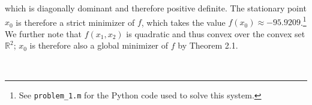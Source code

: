 \begin{solution}
    which is diagonally dominant and therefore positive definite. The stationary point $x_0$ is therefore a strict 
    minimizer of $f$, which takes the value $f(x_0) \approx -95.9209$.\footnote{
        See \texttt{problem\_1.m} for the Python code used to solve this system.
    } We further note that $f(x_1, x_2)$ is quadratic and thus convex over the convex set $\mathbb{R}^2$; $x_0$ is 
    therefore also a global minimizer of $f$ by Theorem 2.1.

    \ \\
\end{solution}
